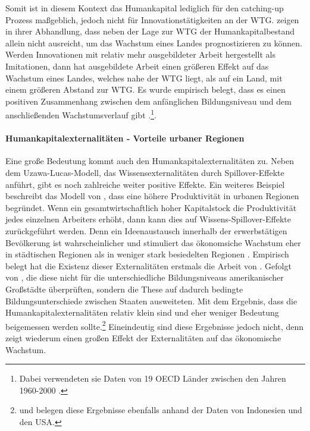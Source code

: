 Somit ist in diesem Kontext das Humankapital lediglich f{\"u}r den catching-up Prozess ma{\ss}geblich, jedoch nicht f{\"u}r Innovationst{\"a}tigkeiten an der WTG. \citet{Krueger.2001} zeigen in ihrer Abhandlung, dass neben der Lage zur WTG  der Humankapitalbestand allein nicht ausreicht, um das Wachstum eines Landes prognostizieren zu k{\"o}nnen.\newline
Werden Innovationen mit relativ mehr ausgebildeter Arbeit hergestellt als Imitationen, dann hat ausgebildete Arbeit einen gr{\"o}{\ss}eren Effekt auf das Wachstum eines Landes, welches nahe der WTG liegt, als auf ein Land, mit einem gr{\"o}{\ss}eren Abstand zur WTG. Es wurde empirisch belegt, dass es einen positiven Zusammenhang zwischen dem anf{\"a}nglichen Bildungsniveau und dem anschlie{\ss}enden Wachstumsverlauf gibt \citep{Vandenbussche.2006}.\footnote{Dabei verwendeten sie Daten von 19 OECD L{\"a}nder zwischen den Jahren 1960-2000 \citep{Vandenbussche.2006}.}.


\paragraph{Humankapitalexternalitäten - Vorteile urbaner Regionen}
Eine gro{\ss}e Bedeutung kommt auch den Humankapitalexternalitäten zu. Neben dem Uzawa-Lucas-Modell, das Wissensexternalitäten durch Spillover-Effekte anführt, gibt es noch zahlreiche weiter positive Effekte. Ein weiteres Beispiel beschreibt das Modell von \citet{Jacobs.1970}, dass eine höhere Produktivität in urbanen Regionen begründet.
Wenn ein gesamtwirtschaftlich hoher Kapitalstock die Produktivit{\"a}t jedes einzelnen Arbeiters erh{\"o}ht, dann kann dies auf Wissens-Spillover-Effekte zurückgeführt werden. Denn ein Ideenaustausch innerhalb der erwerbst{\"a}tigen Bev{\"o}lkerung ist wahrscheinlicher und stimuliert das {\"o}konomsiche Wachstum eher in städtischen Regionen als in weniger stark besiedelten Regionen \cite{Azariades.1990,Lucas.1988}. Empirisch belegt hat die Existenz dieser Externalit{\"a}ten erstmals die Arbeit von \citet{Rauch.}. Gefolgt von \citet{Acemoglu.2000}, die diese nicht f{\"u}r die unterschiedliche Bildungsniveaus amerikanischer Gro{\ss}st{\"a}dte überprüften, sondern die These auf dadurch bedingte Bildungsunterschiede zwischen Staaten ausweiteten. Mit dem Ergebnis, dass die Humankapitalexternalit{\"a}ten relativ klein sind und eher weniger Bedeutung beigemessen werden sollte.\footnote{\citet{Duflo.2004} und \citet{Ciccone.Apr} belegen diese Ergebnisse ebenfalls anhand der Daten von Indonesien und den USA.} Eineindeutig sind diese Ergebnisse jedoch nicht, denn \citet{Moretti.2004} zeigt wiederum einen gro{\ss}en Effekt der Externalit{\"a}ten auf das {\"o}konomische Wachstum.\\